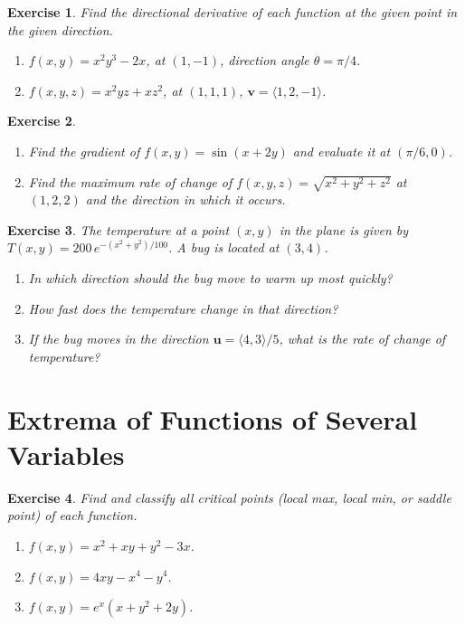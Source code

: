 \documentclass[12pt,a4paper]{article}
\theoremstyle{exercise}
\newtheorem{exercise}{Exercise}[section]
\theoremstyle{hint}
\begin{document}
\begin{exercise}
Find the directional derivative of each function at the given point in
the given direction.
\begin{enumerate}[label=(\alph*)]
  \item $f(x,y)=x^{2}y^{3}-2x$,\; at $(1,-1)$,\;
        direction angle $\theta=\pi/4$.
  \item $f(x,y,z)=x^{2}yz+xz^{2}$,\; at $(1,1,1)$,\;
        $\mathbf{v}=\langle 1,2,-1\rangle$.
\end{enumerate}
\end{exercise}

\begin{exercise}
\begin{enumerate}[label=(\alph*)]
  \item Find the gradient of $f(x,y)=\sin(x+2y)$ and evaluate it at
        $(\pi/6,0)$.
  \item Find the maximum rate of change of
        $f(x,y,z)=\sqrt{x^{2}+y^{2}+z^{2}}$ at $(1,2,2)$ and the
        direction in which it occurs.
\end{enumerate}
\end{exercise}

\begin{exercise}
The temperature at a point $(x,y)$ in the plane is given by
$T(x,y)=200\,e^{-(x^{2}+y^{2})/100}$.
A bug is located at $(3,4)$.
\begin{enumerate}[label=(\alph*)]
  \item In which direction should the bug move to warm up most quickly?
  \item How fast does the temperature change in that direction?
  \item If the bug moves in the direction $\mathbf{u}=\langle 4,3\rangle/5$,
        what is the rate of change of temperature?
\end{enumerate}
\end{exercise}

\section{Extrema of Functions of Several Variables}

\begin{exercise}
Find and classify all critical points (local max, local min, or saddle
point) of each function.
\begin{enumerate}[label=(\alph*)]
  \item $f(x,y)=x^{2}+xy+y^{2}-3x$.
  \item $f(x,y)=4xy-x^{4}-y^{4}$.
  \item $f(x,y)=e^{x}(x+y^{2}+2y)$.
\end{enumerate}
\end{exercise}
\end{document}

